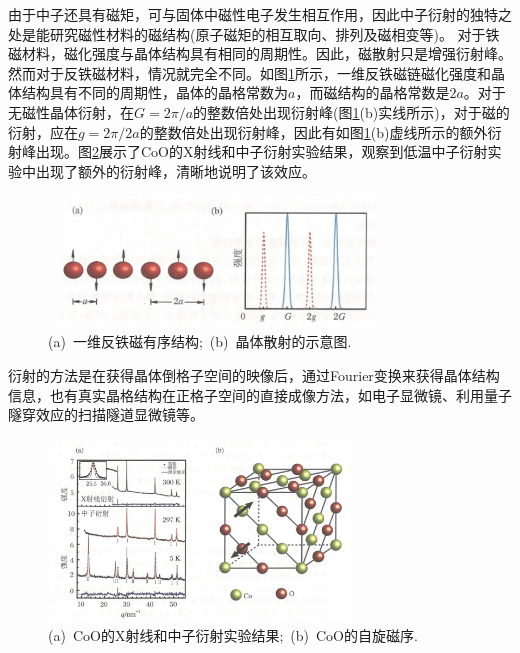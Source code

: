 由于中子还具有磁矩，可与固体中磁性电子发生相互作用，因此中子衍射的独特之处是能研究磁性材料的磁结构(原子磁矩的相互取向、排列及磁相变等)。 对于铁磁材料，磁化强度与晶体结构具有相同的周期性。因此，磁散射只是增强衍射峰。然而对于反铁磁材料，情况就完全不同。如图\ref{Fig:AFM-dispersion}所示，一维反铁磁链磁化强度和晶体结构具有不同的周期性，晶体的晶格常数为$a$，而磁结构的晶格常数是$2a$。对于无磁性晶体衍射，在$G=2\pi/a$的整数倍处出现衍射峰(图\ref{Fig:AFM-dispersion}(b)实线所示)，对于磁的衍射，应在$g=2\pi/2a$的整数倍处出现衍射峰，因此有如图\ref{Fig:AFM-dispersion}(b)虚线所示的额外衍射峰出现。图\ref{Fig:Diffration}展示了CoO的X射线和中子衍射实验结果，观察到低温中子衍射实验中出现了额外的衍射峰，清晰地说明了该效应。
\begin{figure}[h!]
\centering
\vspace*{-0.05in}
\includegraphics[height=1.38in,width=3.55in,viewport=0 0 103 40,clip]{Figures/AFM_dispersion.png}
\caption{\small \textrm{(a)~一维反铁磁有序结构;~(b)~晶体散射的示意图.}}%
\label{Fig:AFM-dispersion}
\end{figure}
衍射的方法是在获得晶体倒格子空间的映像后，通过Fourier变换来获得晶体结构信息，也有真实晶格结构在正格子空间的直接成像方法，如电子显微镜、利用量子隧穿效应的扫描隧道显微镜等。
\begin{figure}[h!]
\centering
\vspace*{-0.05in}
\includegraphics[height=1.90in,width=3.15in,viewport=0 0 130 80,clip]{Figures/X-Ray_Neutron-diffration.png}
\caption{\small \textrm{(a)~CoO的X射线和中子衍射实验结果;~(b)~CoO的自旋磁序.}}%
\label{Fig:Diffration}
\end{figure}

